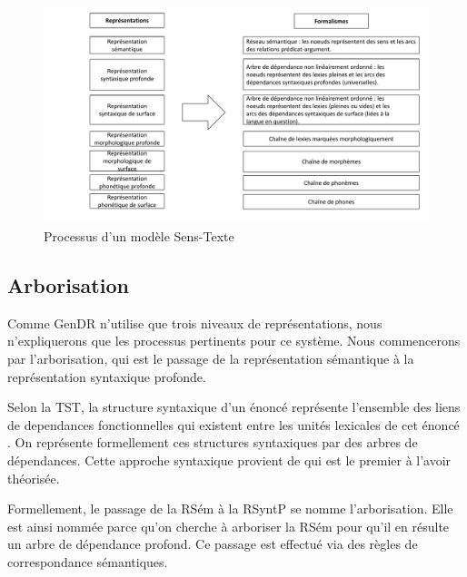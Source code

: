 \begin{figure}[htb]
	\centering
	\includegraphics[width=1\textwidth, trim = {0cm 0cm 0cm 0cm},clip]{ch3/figs/polguere2.pdf}
	\caption{Processus d'un modèle Sens-Texte \citep{PolgueretheorieSensTexte1998}}
	\label{fig:processustst}
\end{figure}


\subsection{Arborisation}\label{sec:arbo}

Comme GenDR n'utilise que trois niveaux de représentations, nous n'expliquerons que les processus pertinents pour ce système. Nous commencerons par l'arborisation, qui est le passage de la représentation sémantique à la représentation syntaxique profonde.

Selon la \ac{TST}, la structure syntaxique d'un énoncé représente l'ensemble des liens de dependances fonctionnelles qui existent entre les unités lexicales de cet énoncé \citep{melcuk1988}. On représente formellement ces structures syntaxiques par des arbres de dépendances. Cette approche syntaxique provient de \cite{TesniereElementssyntaxestructurale1965} qui est le premier à l'avoir théorisée.

Formellement, le passage de la RSém  à la RSyntP se nomme l'arborisation. Elle est ainsi nommée  parce qu'on cherche à arboriser la RSém pour qu'il en résulte un arbre de dépendance profond. Ce passage est effectué via des règles de correspondance sémantiques.

